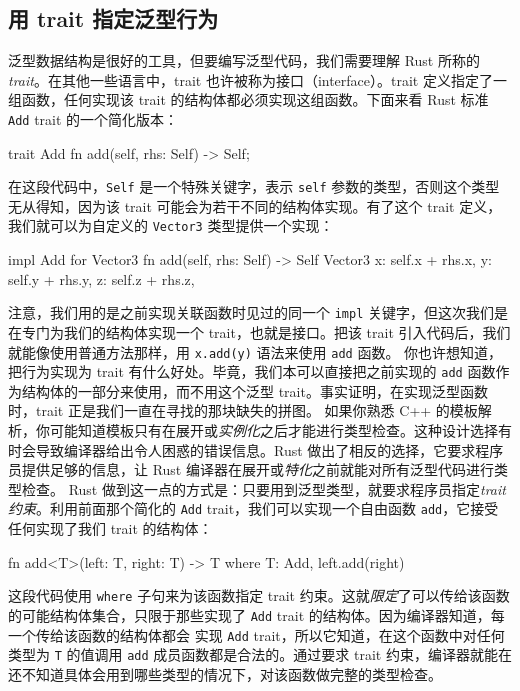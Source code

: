 \subsection{用 trait 指定泛型行为}
\label{idx:idx_3b2725d0}
\label{idx:idx_e14fc5e7}
\label{idx:idx_37250bf3}
泛型数据结构是很好的工具，但要编写泛型代码，我们需要理解 Rust 所称的\emph{trait}。在其他一些语言中，trait 也许被称为接口（interface）。trait 定义指定了一组函数，任何实现该 trait 的结构体都必须实现这组函数。下面来看 Rust 标准 \texttt{Add} trait 的一个简化版本：
\begin{codebox}[rust]
trait Add {
    fn add(self, rhs: Self) -> Self;
}
\end{codebox}
在这段代码中，\texttt{Self} 是一个特殊关键字，表示 \texttt{self} 参数的类型，否则这个类型无从得知，因为该 trait 可能会为若干不同的结构体实现。有了这个 trait 定义，我们就可以为自定义的
\texttt{Vector3} 类型提供一个实现：
\begin{codebox}[rust]
impl Add for Vector3 {
    fn add(self, rhs: Self) -> Self {
        Vector3 {
            x: self.x + rhs.x,
            y: self.y + rhs.y,
            z: self.z + rhs.z,
        }
    }
}
\end{codebox}
注意，我们用的是之前实现关联函数时见过的同一个 \texttt{impl} 关键字，但这次我们是在专门为我们的结构体实现一个 trait，也就是接口。把该 trait 引入代码后，我们就能像使用普通方法那样，用 \texttt{x.add(y)} 语法来使用 \texttt{add} 函数。
\label{idx:idx_f7f00398}
你也许想知道，把行为实现为 trait 有什么好处。毕竟，我们本可以直接把之前实现的 \texttt{add} 函数作为结构体的一部分来使用，而不用这个泛型 trait。事实证明，在实现泛型函数时，trait 正是我们一直在寻找的那块缺失的拼图。
\label{idx:idx_8b04c2e8}
如果你熟悉 C++ 的模板解析，你可能知道模板只有在展开或\emph{实例化}之后才能进行类型检查。这种设计选择有时会导致编译器给出令人困惑的错误信息。Rust 做出了相反的选择，它要求程序员提供足够的信息，让 Rust 编译器在展开或\emph{特化}之前就能对所有泛型代码进行类型检查。
Rust 做到这一点的方式是：只要用到泛型类型，就要求程序员指定\emph{trait 约束}。利用前面那个简化的 \texttt{Add} trait，我们可以实现一个自由函数 \texttt{add}，它接受任何实现了我们 trait 的结构体：
\begin{codebox}[rust]
fn add<T>(left: T, right: T) -> T
where
    T: Add,
{
    left.add(right)
}
\end{codebox}
这段代码使用 \texttt{where} 子句来为该函数指定 trait 约束。这就\emph{限定}了可以传给该函数的可能结构体集合，只限于那些实现了
\texttt{Add} trait 的结构体。因为编译器知道，每一个传给该函数的结构体都会
实现 \texttt{Add} trait，所以它知道，在这个函数中对任何类型为 \texttt{T} 的值调用 \texttt{add} 成员函数都是合法的。通过要求 trait 约束，编译器就能在还不知道具体会用到哪些类型的情况下，对该函数做完整的类型检查。
